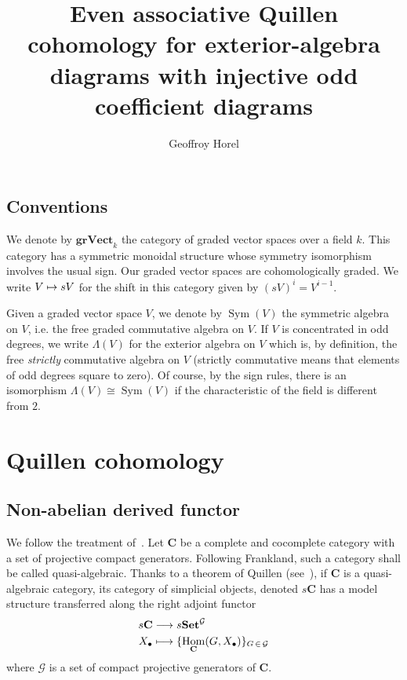 \documentclass[10pt]{amsart}
\theoremstyle{definition}\newtheorem{defi}[theo]{Definition}\newtheorem{rema}[theo]{Remark}\newtheorem{exam}[theo]{Example}\newtheorem{exem}[theo]{Example}\newtheorem{nota}[theo]{Notation}
\DeclareMathOperator{\Hom}{Hom}
\DeclareMathOperator{\sym}{Sym}
\newcommand{\grVect}{\mathbf{grVect}}
\newcommand{\bSet}{\mathbf{Set}}
\newcommand{\bfC}{\mathbf{C}}
\newcommand{\clG}{\mathcal{G}}
\renewcommand*{\to}{\mathchoice{\longrightarrow}{\rightarrow}{\rightarrow}{\rightarrow}}
\let\oldmapsto\mapsto
\renewcommand*{\mapsto}{\mathchoice{\longmapsto}{\oldmapsto}{\oldmapsto}{\oldmapsto}}
\begin{document}
\title{Even associative Quillen cohomology for exterior-algebra diagrams with injective odd coefficient diagrams}
\author{Geoffroy Horel}
\maketitle
\subsection*{Conventions}

We denote by $\grVect_k$ the category of graded vector spaces over a field $k$. This category has a symmetric monoidal structure whose symmetry isomorphism involves the usual sign. Our graded vector spaces are cohomologically graded. We write $V\mapsto sV$ for the shift in this category given by $(sV)^i=V^{i-1}$.

Given a graded vector space $V$, we denote by $\sym(V)$ the symmetric algebra on $V$, i.e. the free graded commutative algebra on $V$. If $V$ is concentrated in odd degrees, we write $\Lambda(V)$ for the exterior algebra on $V$ which is, by definition, the free \emph{strictly} commutative algebra on $V$ (strictly commutative means that elements of odd degrees square to zero). Of course, by the sign rules, there is an isomorphism $\Lambda(V)\cong \sym(V)$ if the characteristic of the field is different from $2$.


\setcounter{section}{1}
\section{Quillen cohomology}

\subsection{Non-abelian derived functor}

We follow the treatment of~\cite{franklandbehavior}. Let $\bfC$ be a complete and cocomplete category with a set of projective compact generators. Following Frankland, such a category shall be called quasi-algebraic. Thanks to a theorem of Quillen (see~\cite[Theorem~2.4]{quillenhomotopical}), if $\bfC$ is a quasi-algebraic category, its category of simplicial objects, denoted $s\bfC$ has a model structure transferred along the right adjoint functor
\begin{align*}
s\bfC&\to s\bSet^{\clG}\\
X_\bullet&\mapsto \{\Hom_{\bfC}(G,X_\bullet)\}_{G\,\in\,\clG}
\end{align*}
where $\clG$ is a set of compact projective generators of $\bfC$.
\end{document}

